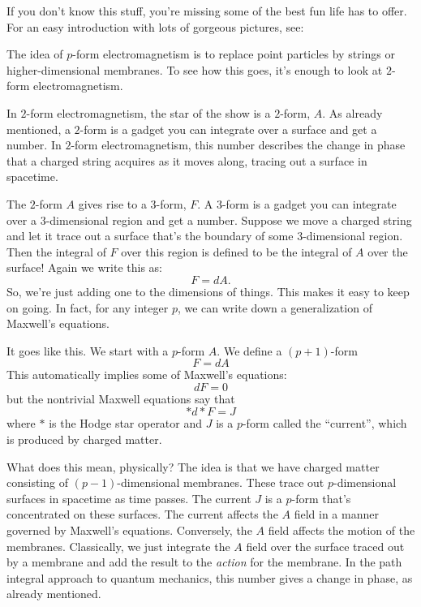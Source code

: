 \documentclass{article}
\def\tightlist{}
\renewcommand{\texttt}[1]{%
  \begingroup
  \ttfamily
  \begingroup\lccode`~=`/\lowercase{\endgroup\def~}{/\discretionary{}{}{}}%
  \begingroup\lccode`~=`[\lowercase{\endgroup\def~}{[\discretionary{}{}{}}%
  \begingroup\lccode`~=`.\lowercase{\endgroup\def~}{.\discretionary{}{}{}}%
  \catcode`/=\active\catcode`[=\active\catcode`.=\active
  \scantokens{#1\noexpand}%
  \endgroup
}
\begin{document}
If you don't know this stuff, you're missing some of the best fun life
has to offer. For an easy introduction with lots of gorgeous pictures,
see:


The idea of \(p\)-form electromagnetism is to replace point particles by
strings or higher-dimensional membranes. To see how this goes, it's
enough to look at \(2\)-form electromagnetism.

In \(2\)-form electromagnetism, the star of the show is a \(2\)-form,
\(A\). As already mentioned, a \(2\)-form is a gadget you can integrate
over a surface and get a number. In \(2\)-form electromagnetism, this
number describes the change in phase that a charged string acquires as
it moves along, tracing out a surface in spacetime.

The \(2\)-form \(A\) gives rise to a \(3\)-form, \(F\). A \(3\)-form is
a gadget you can integrate over a \(3\)-dimensional region and get a
number. Suppose we move a charged string and let it trace out a surface
that's the boundary of some \(3\)-dimensional region. Then the integral
of \(F\) over this region is defined to be the integral of \(A\) over
the surface! Again we write this as: \[F = dA.\] So, we're just adding
one to the dimensions of things. This makes it easy to keep on going. In
fact, for any integer \(p\), we can write down a generalization of
Maxwell's equations.

It goes like this. We start with a \(p\)-form \(A\). We define a
\((p+1)\)-form \[F = dA\] This automatically implies some of Maxwell's
equations: \[dF = 0\] but the nontrivial Maxwell equations say that
\[*d*F = J\] where \(*\) is the Hodge star operator and \(J\) is a
\(p\)-form called the ``current'', which is produced by charged matter.

What does this mean, physically? The idea is that we have charged matter
consisting of \((p-1)\)-dimensional membranes. These trace out
\(p\)-dimensional surfaces in spacetime as time passes. The current
\(J\) is a \(p\)-form that's concentrated on these surfaces. The current
affects the \(A\) field in a manner governed by Maxwell's equations.
Conversely, the \(A\) field affects the motion of the membranes.
Classically, we just integrate the \(A\) field over the surface traced
out by a membrane and add the result to the \emph{action} for the
membrane. In the path integral approach to quantum mechanics, this
number gives a change in phase, as already mentioned.
\end{document}
